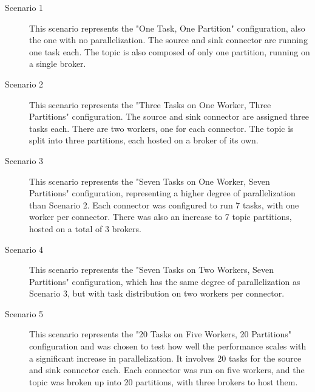 \begin{description}
    \item [Scenario 1]
    This scenario represents the "One Task, One Partition" configuration, also the one with no parallelization. The source and sink connector are running one task each. The topic is also composed of only one partition, running on a single broker.

    \item[Scenario 2]
    This scenario represents the "Three Tasks on One Worker, Three Partitions" configuration. The source and sink connector are assigned three tasks each. There are two workers, one for each connector. The topic is split into three partitions, each hosted on a broker of its own.

    \item[Scenario 3]
    This scenario represents the "Seven Tasks on One Worker, Seven Partitions" configuration, representing a higher degree of parallelization than Scenario 2. Each connector was configured to run 7 tasks, with one worker per connector. There was also an increase to 7 topic partitions, hosted on a total of 3 brokers.

    \item[Scenario 4]
    This scenario represents the "Seven Tasks on Two Workers, Seven Partitions" configuration, which has the same degree of parallelization as Scenario 3, but with task distribution on two workers per connector.
    
    \item[Scenario 5]
    This scenario represents the "20 Tasks on Five Workers, 20 Partitions" configuration and was chosen to test how well the performance scales with a significant increase in parallelization. It involves 20 tasks for the source and sink connector each. Each connector was run on five workers, and the topic was broken up into 20 partitions, with three brokers to host them.
\end{description}

